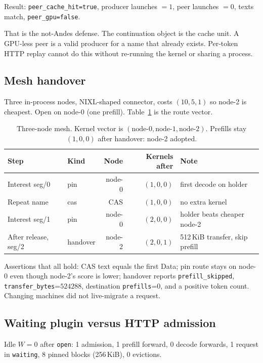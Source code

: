 \documentclass{article}
\theoremstyle{definition}
\begin{document}
Result: \texttt{peer\_cache\_hit=true}, producer launches $=1$, peer launches $=0$, texts match, \texttt{peer\_gpu=false}.

That is the not-Andes defense.
The continuation object is the cache unit.
A GPU-less peer is a valid producer for a name that already exists.
Per-token HTTP replay cannot do this without re-running the kernel or sharing a process.

\subsection{Mesh handover}
\label{sec:mesheval}

Three in-process nodes, NIXL-shaped connector, costs $(10, 5, 1)$ so node-2 is cheapest.
Open on node-0 (one prefill).
Table~\ref{tab:mesh} is the route vector.

\begin{table}[t]
\centering
\small
\caption{Three-node mesh. Kernel vector is $(\mathrm{node\textrm{-}0}, \mathrm{node\textrm{-}1}, \mathrm{node\textrm{-}2})$. Prefills stay $(1,0,0)$ after handover: node-2 adopted.}
\label{tab:mesh}
\begin{tabular}{llrrl}
\toprule
Step & Kind & Node & Kernels after & Note \\
\midrule
Interest seg/0 & pin & node-0 & $(1,0,0)$ & first decode on holder \\
Repeat name & cas & CAS & $(1,0,0)$ & no extra kernel \\
Interest seg/1 & pin & node-0 & $(2,0,0)$ & holder beats cheaper node-2 \\
After release, seg/2 & handover & node-2 & $(2,0,1)$ & 512\,KiB transfer, skip prefill \\
\bottomrule
\end{tabular}
\end{table}

Assertions that all hold: CAS text equals the first Data; pin route stays on node-0 even though node-2's score is lower; handover reports \texttt{prefill\_skipped}, \texttt{transfer\_bytes}{=}$524288$, destination \texttt{prefills}{=}0, and a positive token count.
Changing machines did not live-migrate a request.

\subsection{Waiting plugin versus HTTP admission}

Idle $W{=}0$ after \texttt{open}: 1 admission, 1 prefill forward, 0 decode forwards, 1 request in \texttt{waiting}, 8 pinned blocks (256\,KiB), 0 evictions.
\end{document}
